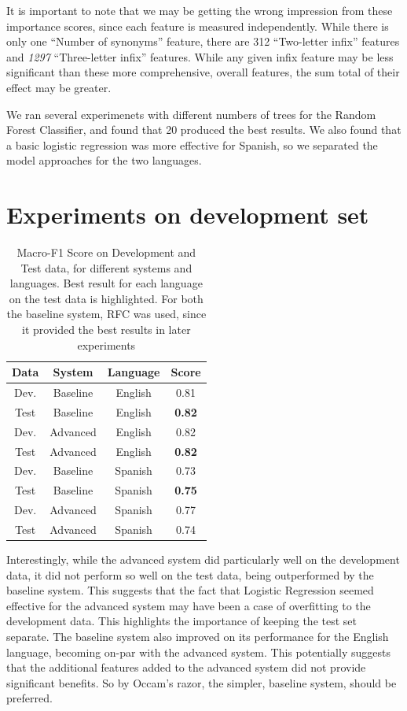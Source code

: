 \documentclass[11pt,a4paper]{article}
\begin{document}
It is important to note that we may be getting the wrong impression from these importance scores, since each feature is measured independently. While there is only one \enquote{Number of synonyms} feature, there are 312 \enquote{Two-letter infix} features and \textit{1297} \enquote{Three-letter infix} features. While any given infix feature may be less significant than these more comprehensive, overall features, the sum total of their effect may be greater.

We ran several experimenets with different numbers of trees for the Random Forest Classifier, and found that 20 produced the best results. We also found that a basic logistic regression was more effective for Spanish, so we separated the model approaches for the two languages.

\section{Experiments on development set}

\begin{table}[h]
\begin{center}
\begin{tabular}{|c|c|c|c|}
\hline
\textbf{Data} & \textbf{System} & \textbf{Language} & \textbf{Score} \\
\hline \hline
Dev. & Baseline & English & 0.81 \\ \hline
Test & Baseline & English & \textbf{0.82} \\ \hline \hline
Dev. & Advanced & English & 0.82 \\ \hline
Test & Advanced & English & \textbf{0.82} \\ \hline \hline
Dev. & Baseline & Spanish & 0.73 \\ \hline
Test & Baseline & Spanish & \textbf{0.75} \\ \hline \hline
Dev. & Advanced & Spanish & 0.77 \\ \hline
Test & Advanced & Spanish & 0.74 \\ \hline
\end{tabular}
\caption{Macro-F1 Score on Development and Test data, for different systems and languages. Best result for each language on the test data is highlighted. For both the baseline system, RFC was used, since it provided the best results in later experiments}
\label{tab:testdev}
\end{center}
\end{table}

Interestingly, while the advanced system did particularly well on the development data, it did not perform so well on the test data, being outperformed by the baseline system. This suggests that the fact that Logistic Regression seemed effective for the advanced system may have been a case of overfitting to the development data. This highlights the importance of keeping the test set separate.  The baseline system also improved on its performance for the English language, becoming on-par with the advanced system. This potentially suggests that the additional features added to the advanced system did not provide significant benefits. So by Occam's razor, the simpler, baseline system, should be preferred.
\end{document}

